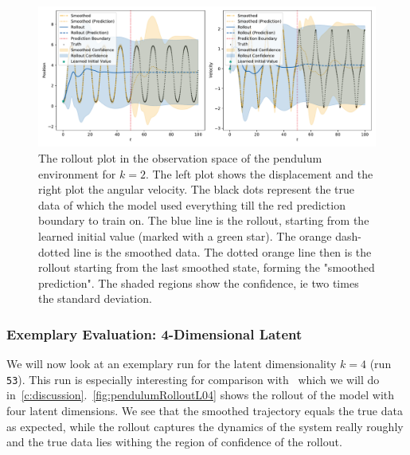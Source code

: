 			\begin{figure}
				\centering
				\includegraphics[width=\linewidth]{figures/results/pendulum/run-latent-dim-02/rollout-observations-N0.pdf}
				\caption{The rollout plot in the observation space of the pendulum environment for \(k = 2\). The left plot shows the displacement and the right plot the angular velocity. The black dots represent the true data of which the model used everything till the red prediction boundary to train on. The blue line is the rollout, starting from the learned initial value (marked with a green star). The orange dash-dotted line is the smoothed data. The dotted orange line then is the rollout starting from the last smoothed state, forming the "smoothed prediction". The shaded regions show the confidence, \ac{ie} two times the standard deviation.}
				\label{fig:pendulumRolloutL02}
			\end{figure}

		\subsubsection{Exemplary Evaluation: 4-Dimensional Latent}
			We will now look at an exemplary run for the latent dimensionality \( k = 4 \) (run \texttt{53}). This run is especially interesting for comparison with~\cite{mortonDeepVariationalKoopman2019a} which we will do in~\autoref{c:discussion}.~\autoref{fig:pendulumRolloutL04} shows the rollout of the model with four latent dimensions. We see that the smoothed trajectory equals the true data as expected, while the rollout captures the dynamics of the system really roughly and the true data lies withing the region of confidence of the rollout.

